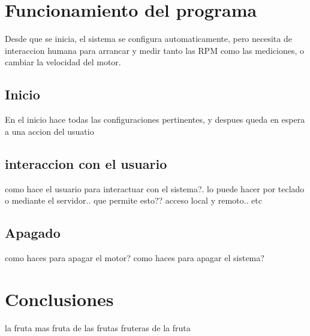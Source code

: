 \documentclass[a4paper]{article}
\begin{document}

\section{Funcionamiento del programa} %
\label{sec:funcionamiento_del_programa}

Desde que se inicia, el sistema se configura automaticamente, pero necesita de interaccion humana para arrancar y medir tanto las RPM como las mediciones, o cambiar la velocidad del motor.

\subsection{Inicio} %
\label{sub:inicio}

En el inicio hace todas las configuraciones pertinentes, y despues queda en espera a una accion del usuatio


\subsection{interaccion con el usuario} %
\label{sub:interaccion_con_el_usuario}

como hace el usuario para interactuar con el sistema?. lo puede hacer por teclado o mediante el servidor.. que permite esto?? acceso local y remoto.. etc


\subsection{Apagado} %
\label{sub:apagado}

como haces para apagar el motor? como haces para apagar el sistema?




\section{Conclusiones} %
\label{sec:conclusiones}

la fruta mas fruta de las frutas fruteras de la fruta









 
\end{document}
